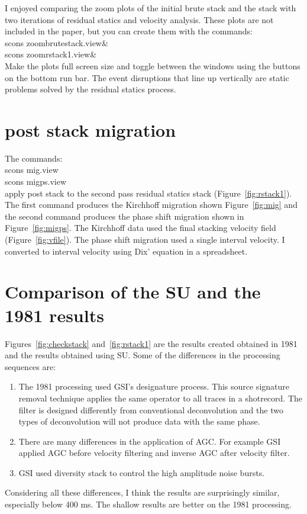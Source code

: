 I enjoyed comparing the zoom plots of the initial brute stack and the stack 
with two iterations of residual statics and velocity analysis.  These plots
are not included in the paper, but you can create them with the commands:\\
scons zoombrutestack.view\& \\
scons zoomrstack1.view\& \\
Make the plots full screen size and toggle between the windows using the 
buttons on the bottom run bar.  The event disruptions that line up vertically
are static problems solved by the residual statics process.
  

\section{post stack migration}
The commands:\\
scons mig.view\\
scons migps.view\\
apply post stack to the second pass residual statics stack 
(Figure~\ref{fig:rstack1}). The first command produces the Kirchhoff 
migration shown Figure~\ref{fig:mig} and the second command produces the 
phase shift migration shown in Figure~\ref{fig:migps}.  The Kirchhoff data 
used the final stacking velocity field (Figure~\ref{fig:vfile}).  The phase 
shift migration used a single interval velocity.  I converted to interval 
velocity using Dix' equation in a spreadsheet.


\section{Comparison of the SU and the 1981 results}
Figures~\ref{fig:checkstack} and~\ref{fig:rstack1} are the results created 
obtained in 1981 and the results obtained using SU.  Some of the differences 
in the processing sequences are:
\begin{enumerate}
\item The 1981 processing used GSI's designature process.  This source 
signature removal technique applies the same operator to all traces in a 
shotrecord.  The filter is designed differently from conventional 
deconvolution and the two types of deconvolution will not produce data 
with the same phase. 
\item There are many differences in the application of AGC.  For example 
GSI applied AGC before velocity filtering and inverse AGC after velocity 
filter.
\item GSI used diversity stack to control the high amplitude noise bursts.
\end{enumerate}
Considering all these differences, I think the results are surprisingly 
similar, especially below 400 ms.  The shallow results are better on the 
1981 processing.

